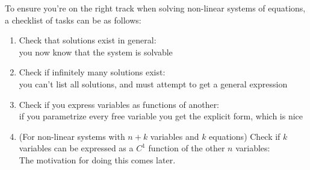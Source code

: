 \noindent To ensure you're on the right track when solving non-linear systems of equations, a checklist of tasks can be as follows:
\begin{enumerate}
\item Check that solutions exist in general:\\
    you now know that the system is solvable
\item Check if infinitely many solutions exist:\\
    you can't list all solutions, and must attempt to get a general expression
\item Check if you express variables as functions of another:\\
    if you parametrize every free variable you get the explicit form, which is nice
\item (For non-linear systems with $n + k$ variables and $k$ equations) Check if $k$ variables can be expressed as a $C^1$ function of the other $n$ variables: \\
    The motivation for doing this comes later.
\end{enumerate}   

